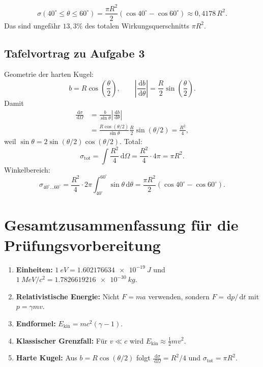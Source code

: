 \documentclass[11pt,a4paper]{scrartcl}
\newcommand{\abs}[1]{\left| #1 \right|}
\newcommand{\paren}[1]{\left( #1 \right)}
\newcommand{\dd}{\,\mathrm{d}}
\newcommand{\dv}[2]{\frac{\dd #1}{\dd #2}}
\newcommand{\half}{\frac{1}{2}}
\newcommand{\diffxs}{\frac{\dd\sigma}{\dd\Omega}}
\theoremstyle{definition}
\theoremstyle{plain}
\theoremstyle{remark}
\begin{document}
\begin{enumerate}[label=(\alph*)]
    \begin{answerbox}
    \[
        \boxed{\sigma(40^\circ\le\theta\le60^\circ)
        =\frac{\pi R^2}{2}\paren{\cos40^\circ-\cos60^\circ}
        \approx 0{,}4178\,R^2}.
    \]
    Das sind ungefähr $13{,}3\%$ des totalen Wirkungsquerschnitts $\pi R^2$.
    \end{answerbox}
\end{enumerate}

\subsection{Tafelvortrag zu Aufgabe 3}
\begin{talkbox}
Geometrie der harten Kugel:
\[
    b=R\cos\paren{\frac{\theta}{2}},
    \qquad
    \abs{\dv{b}{\theta}}=\frac{R}{2}\sin\paren{\frac{\theta}{2}}.
\]
Damit
\begin{align*}
    \diffxs
    &=\frac{b}{\sin\theta}\abs{\dv{b}{\theta}}\\
    &=\frac{R\cos(\theta/2)}{\sin\theta}\frac{R}{2}\sin(\theta/2)
     =\frac{R^2}{4},
\end{align*}
weil $\sin\theta=2\sin(\theta/2)\cos(\theta/2)$.
Total:
\[
    \sigma_{\mathrm{tot}}
    =\int\frac{R^2}{4}\dd\Omega
    =\frac{R^2}{4}\cdot4\pi
    =\pi R^2.
\]
Winkelbereich:
\[
    \sigma_{40^\circ\ldots60^\circ}
    =\frac{R^2}{4}\cdot2\pi\int_{40^\circ}^{60^\circ}\sin\theta\dd\theta
    =\frac{\pi R^2}{2}\paren{\cos40^\circ-\cos60^\circ}.
\]
\end{talkbox}

\FloatBarrier
\newpage

\section{Gesamtzusammenfassung für die Prüfungsvorbereitung}

\begin{summarybox}[title=Was man sicher können sollte]
\begin{enumerate}
    \item \textbf{Einheiten:} $\SI{1}{eV}=\SI{1.602176634e-19}{J}$ und $\SI{1}{MeV}/c^2=\SI{1.7826619216e-30}{kg}$.
    \item \textbf{Relativistische Energie:} Nicht $F=ma$ verwenden, sondern $F=\dd p/\dd t$ mit $p=\gamma mv$.
    \item \textbf{Endformel:} $E_{\mathrm{kin}}=mc^2(\gamma-1)$.
    \item \textbf{Klassischer Grenzfall:} Für $v\ll c$ wird $E_{\mathrm{kin}}\approx \half mv^2$.
    \item \textbf{Harte Kugel:} Aus $b=R\cos(\theta/2)$ folgt $\diffxs=R^2/4$ und $\sigma_{\mathrm{tot}}=\pi R^2$.
\end{enumerate}
\end{summarybox}
\end{document}
